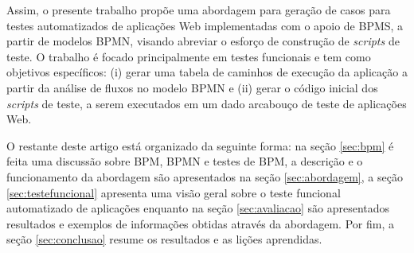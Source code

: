 \documentclass[12pt]{article}
\begin{document}
Assim, o presente trabalho propõe uma abordagem para geração de casos para testes automatizados de aplicações Web implementadas com o apoio de BPMS, a partir de modelos BPMN, visando abreviar o esforço de construção de \emph{scripts} de teste. O trabalho é focado principalmente em testes funcionais e tem como objetivos específicos: (i) gerar uma tabela de caminhos de execução da aplicação a partir da análise de fluxos no modelo BPMN e (ii) gerar o código inicial dos \emph{scripts} de teste, a serem executados em um dado arcabouço de teste de aplicações Web.

O restante deste artigo está organizado da seguinte forma: na seção \ref{sec:bpm} é feita uma discussão sobre BPM, BPMN e testes de BPM, a descrição e o funcionamento da abordagem são apresentados na seção \ref{sec:abordagem}, a seção \ref{sec:testefuncional} apresenta uma visão geral sobre o teste funcional automatizado de aplicações enquanto na seção \ref{sec:avaliacao} são apresentados resultados e exemplos de informações obtidas através da abordagem. Por fim, a seção \ref{sec:conclusao} resume os resultados e as lições aprendidas.




\end{document}

